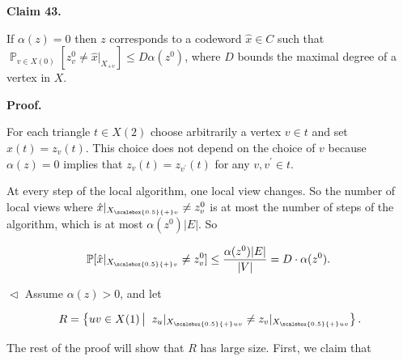 

\par\medskip\noindent\textbf{
Claim 43. 
}\par



If $\alpha(z)=0$ then $z$ corresponds to a codeword $\hat{x}\in C$ such that $\operatorname*{\mathbb{P}}_{v\in X(0)}[z_{v}^{0}\not=\hat{x}|_{X_{+v}}]\leq D\alpha(z^{0})$,
where $D$ bounds the maximal degree of a vertex in $X$.\par







\par\medskip\noindent\textbf{
\textbf{Proof}.}\par




For each triangle $t\in X(2)$ choose arbitrarily a vertex $v\in t$ and set $\hat{x}(t)=z_{v}(t)$. This choice does not depend on the choice of $v$ because $\alpha(z)=0$ implies that $z_{v}(t)=z_{v^{\prime}}(t)$ for any $v,v^{\prime}\in t$.\par




At every step of the local algorithm, one local view changes. So the number of local views where $\hat{x}|_{{X}_{\scalebox{0.5}{+}v}}\neq z^{0}_{v}$ is at most the number of steps of the algorithm, which is at most $\alpha(z^{0})|E|$. So\par


\[\begin{gathered}
\operatorname*{\mathbb{P}}[\hat{x}|_{{X}_{\scalebox{0.5}{+}v}}\neq z^{0}_{v}]\leq\frac{\alpha(z^{0})|E|}{|V|}=D\cdot\alpha(z^{0}).\
\end{gathered}\]


$\vartriangleleft$
Assume $\alpha(z)>0$, and let\par


\[\begin{gathered}
R=\left\{uv\in X(1)\left|\;\vphantom{uv\in X(1)z_{u}|_{{X}_{\scalebox{0.5}{+}uv}}\neq z_{v}|_{{X}_{\scalebox{0.5}{+}uv}}}\right.z_{u}|_{{X}_{\scalebox{0.5}{+}uv}}\neq z_{v}|_{{X}_{\scalebox{0.5}{+}uv}}\right\}.
\end{gathered}\]


The rest of the proof will show that $R$ has large size.
First, we claim that\par


